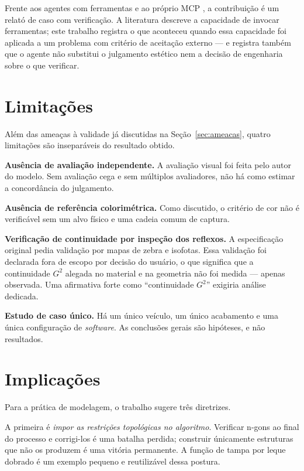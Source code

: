 Frente aos agentes com ferramentas \cite{schick2023, qin2023, yao2023} e ao pr\'oprio
MCP \cite{mcpspec2024}, a contribui{\c{c}}\~ao \'e um relat\'o de caso com
verifica{\c{c}}\~ao. A literatura descreve a capacidade de invocar ferramentas; este
trabalho registra o que aconteceu quando essa capacidade foi aplicada a um problema com
crit\'erio de aceita{\c{c}}\~ao externo --- e registra tamb\'em que o agente n\~ao
substitui o julgamento est\'etico nem a decis\~ao de engenharia sobre o que verificar.

\section{Limita{\c{c}}\~oes}\label{sec:limitacoes-discussao}

Al\'em das amea{\c{c}}as \`a validade j\'a discutidas na Se{\c{c}}\~ao~\ref{sec:ameacas},
quatro limita{\c{c}}\~oes s\~ao insepar\'aveis do resultado obtido.

\textbf{Aus\^encia de avalia{\c{c}}\~ao independente.} A avalia{\c{c}}\~ao visual foi feita
pelo autor do modelo. Sem avalia{\c{c}}\~ao cega e sem m\'ultiplos avaliadores, n\~ao h\'a
como estimar a concord\^ancia do julgamento.

\textbf{Aus\^encia de refer\^encia colorim\'etrica.} Como discutido, o crit\'erio de cor
n\~ao \'e verific\'avel sem um alvo f\'isico e uma cadeia comum de captura.

\textbf{Verifica{\c{c}}\~ao de continuidade por inspe{\c{c}}\~ao dos reflexos.} A
especifica{\c{c}}\~ao original pedia valida{\c{c}}\~ao por mapas de zebra e isofotas. Essa
valida{\c{c}}\~ao foi declarada fora de escopo por decis\~ao do usu\'ario, o que
significa que a continuidade $G^2$ alegada no material e na geometria n\~ao foi medida ---
apenas observada. Uma afirmativa forte como ``continuidade $G^2$'' exigiria an\'alise
dedicada.

\textbf{Estudo de caso \'unico.} H\'a um \'unico ve\'iculo, um \'unico acabamento e uma
\'unica configura{\c{c}}\~ao de \emph{software}. As conclus\~oes gerais s\~ao
hip\'oteses, e n\~ao resultados.

\section{Implica{\c{c}}\~oes}

Para a pr\'atica de modelagem, o trabalho sugere tr\^es diretrizes.

A primeira \'e \emph{impor as restri{\c{c}}\~oes topol\'ogicas no algoritmo}. Verificar n-gons
ao final do processo e corrigi-los \'e uma batalha perdida; construir \'unicamente
estruturas que n\~ao os produzem \'e uma vit\'oria permanente. A fun{\c{c}}\~ao de tampa por
leque dobrado \'e um exemplo pequeno e reutiliz\'avel dessa postura.

